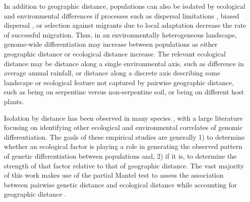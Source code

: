 In addition to geographic distance, populations can also be isolated by ecological and environmental differences if processes such as dispersal limitations \citep{Wright1943}, biased dispersal \citep[e.g.][]{EdelaarBolnick2012}, or selection against migrants due to local adaptation \citep{Wright1943, Hendry2004} decrease the rate of successful migration. Thus, in an environmentally heterogeneous landscape, genome-wide differentiation may increase between populations as either geographic distance or ecological distance increase.  The relevant ecological distance may be distance along a single environmental axis, such as difference in average annual rainfall, or distance along a discrete axis describing some landscape or ecological feature not captured by pairwise geographic distance, such as being on serpentine versus non-serpentine soil, or being on different host plants.  

Isolation by distance has been observed in many species \citep{VekemansHardy2004, Meirmans2012}, with a large literature focusing on identifying other ecological and environmental correlates of genomic differentiation.  The goals of these empirical studies are generally 1) to determine whether an ecological factor is playing a role in generating the observed pattern of genetic differentiation between populations and, 2) if it is, to determine the strength of that factor relative to that of geographic distance. The vast majority of this work makes use of the partial Mantel test to assess the association between pairwise genetic distance and ecological distance while accounting for geographic distance \citep{Smouse1986}. 

